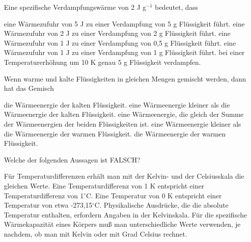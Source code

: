 \documentclass[11pt]{exam}
\begin{document}
\setlength{\voffset}{-0.5in}
\setlength{\headsep}{5pt}

\hspace{2mm}
 \hspace{5mm}
\vspace{4mm}

\begin{questions}

\question Eine spezifische Verdampfungswärme von 2 J g\(^{-1}\) bedeutet, dass

\begin{choices}
	\choice eine Wärmezufuhr von 5 J zu einer Verdampfung von 5 g Flüssigkeit führt.
	\choice eine Wärmezufuhr von 2 J zu einer Verdampfung von 2 g Flüssigkeit führt.
	\choice eine Wärmezufuhr von 1 J zu einer Verdampfung von 0,5 g Flüssigkeit führt.
	\choice eine Wärmezufuhr von 1 J zu einer Verdampfung von 1 g Flüssigkeit führt.
	\choice bei einer Temperaturerhöhung um 10 K genau 5 g Flüssigkeit verdampfen.
\end{choices}

\vspace{3mm}\question Wenn warme und kalte Flüssigkeiten in gleichen Mengen gemischt werden, dann hat das Gemisch

\begin{choices}
	\choice die Wärmeenergie der kalten Flüssigkeit.
	\choice eine Wärmeenergie kleiner als die Wärmeenergie der kalten Flüssigkeit.
	\choice eine Wärmeenergie, die gleich der Summe der Wärmeenergien der beiden Flüssigkeiten ist.
	\choice eine Wärmeenergie kleiner als die Wärmeenergie der warmen Flüssigkeit.
	\choice die Wärmeenergie der warmen Flüssigkeit.
\end{choices}

\vspace{3mm}\question Welche der folgenden Aussagen ist FALSCH?

\begin{choices}
	\choice Für Temperaturdifferenzen erhält man mit der Kelvin- und der Celsiusskala die gleichen Werte.
	\choice Eine Temperaturdifferenz von 1 K entspricht einer Temperaturdifferenz von 1\(^\circ\)C.
	\choice Eine Temperatur von 0 K entspricht einer Temperatur von etwa -273,15\(^\circ\)C.
	\choice Physikalische Ausdrücke, die die absolute Temperatur enthalten, erfordern Angaben in der Kelvinskala.
	\choice Für die spezifische Wärmekapazität eines Körpers muß man unterschiedliche Werte verwenden, je nachdem, ob man mit Kelvin oder mit Grad Celsius rechnet.
\end{choices}


\end{questions}
\end{document}

